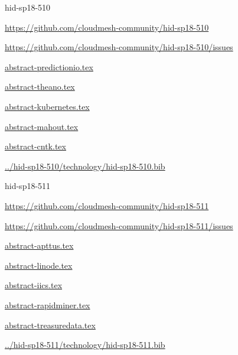 \begin{IU}

hid-sp18-510

\url{https://github.com/cloudmesh-community/hid-sp18-510}

\url{https://github.com/cloudmesh-community/hid-sp18-510/issues}

\href{https://github.com/cloudmesh-community/hid-sp18-510/blob/master//technology/abstract-predictionio.tex}{abstract-predictionio.tex}

\href{https://github.com/cloudmesh-community/hid-sp18-510/blob/master//technology/abstract-theano.tex}{abstract-theano.tex}

\href{https://github.com/cloudmesh-community/hid-sp18-510/blob/master//technology/abstract-kubernetes.tex}{abstract-kubernetes.tex}

\href{https://github.com/cloudmesh-community/hid-sp18-510/blob/master//technology/abstract-mahout.tex}{abstract-mahout.tex}

\href{https://github.com/cloudmesh-community/hid-sp18-510/blob/master//technology/abstract-cntk.tex}{abstract-cntk.tex}

\href{https://github.com/cloudmesh-community/hid-sp18-510/blob/master//technology/hid-sp18-510.bib}{../hid-sp18-510/technology/hid-sp18-510.bib}

\end{IU}


\begin{IU}

hid-sp18-511

\url{https://github.com/cloudmesh-community/hid-sp18-511}

\url{https://github.com/cloudmesh-community/hid-sp18-511/issues}

\href{https://github.com/cloudmesh-community/hid-sp18-511/blob/master//technology/abstract-apttus.tex}{abstract-apttus.tex}

\href{https://github.com/cloudmesh-community/hid-sp18-511/blob/master//technology/abstract-linode.tex}{abstract-linode.tex}

\href{https://github.com/cloudmesh-community/hid-sp18-511/blob/master//technology/abstract-iics.tex}{abstract-iics.tex}

\href{https://github.com/cloudmesh-community/hid-sp18-511/blob/master//technology/abstract-rapidminer.tex}{abstract-rapidminer.tex}

\href{https://github.com/cloudmesh-community/hid-sp18-511/blob/master//technology/abstract-treasuredata.tex}{abstract-treasuredata.tex}

\href{https://github.com/cloudmesh-community/hid-sp18-511/blob/master//technology/hid-sp18-511.bib}{../hid-sp18-511/technology/hid-sp18-511.bib}

\end{IU}


